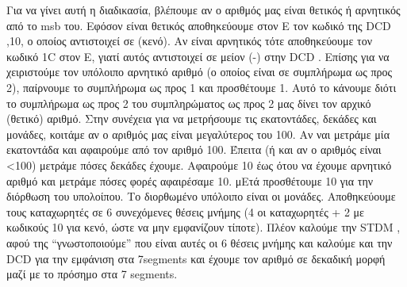 \documentclass[a4paper,10pt]{article} \usepackage{anysize}
\begin{document}
Για να γίνει αυτή η διαδικασία, βλέπουμε αν ο αριθμός μας είναι θετικός ή
αρνητικός από το msb του. Εφόσον είναι θετικός αποθηκεύουμε στον Ε τον κωδικό
της DCD ,10, ο οποίος αντιστοιχεί σε (κενό). Αν είναι αρνητικός τότε
αποθηκεύουμε τον κωδικό 1C στον E, γιατί αυτός αντιστοιχεί σε μείον (-) στην
DCD . Επίσης για να χειριστούμε τον  υπόλοιπο αρνητικό αριθμό (ο οποίος είναι
σε συμπλήρωμα ως προς 2), παίρνουμε το συμπλήρωμα ως προς 1 και προσθέτουμε 1.
Αυτό το κάνουμε διότι το συμπλήρωμα ως προς 2 του συμπληρώματος ως προς 2 μας
δίνει τον αρχικό (θετικό) αριθμό. Στην συνέχεια για να μετρήσουμε τις
εκατοντάδες, δεκάδες και μονάδες, κοιτάμε αν ο αριθμός μας είναι μεγαλύτερος
του 100. Αν ναι μετράμε μία εκατοντάδα και αφαιρούμε από τον αριθμό 100.
Έπειτα (ή και αν ο αριθμός είναι <100) μετράμε πόσες δεκάδες έχουμε. Αφαιρούμε
10   έως ότου να έχουμε αρνητικό αριθμό και μετράμε πόσες φορές αφαιρέσαμε 10.
μΕτά προσθέτουμε 10 για την διόρθωση του υπολοίπου. Το διορθωμένο υπόλοιπο
είναι οι μονάδες. Αποθηκεύουμε τους καταχωρητές σε 6 συνεχόμενες θέσεις μνήμης
(4 οι καταχωρητές + 2 με κωδικούς 10 για κενό, ώστε να μην εμφανίζουν τίποτε).
Πλέον καλούμε την  STDM , αφού της “γνωστοποιούμε” που είναι αυτές οι 6 θέσεις
μνήμης και καλούμε και την DCD για την εμφάνιση στα 7segments και έχουμε τον
αριθμό σε δεκαδική μορφή μαζί με το πρόσημο στα 7 segments.


\inputminted[linenos,obeytabs,frame=leftline,fontsize=\footnotesize]{oldasm}{files/askhsh_4_iv.8085}
\end{document}
